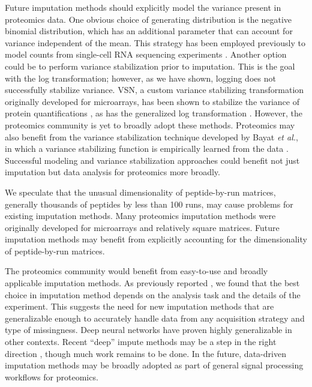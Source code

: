 \documentclass{article}
\begin{document}
Future imputation methods should explicitly model the variance present in proteomics data. One obvious choice of generating distribution is the negative binomial distribution, which has an additional parameter that can account for variance independent of the mean. This strategy has been employed previously to model counts from single-cell RNA sequencing experiments \cite{ZINB, neg-binom-scRNAseq}. Another option could be to perform variance stabilization prior to imputation. This is the goal with the log transformation; however, as we have shown, logging does not successfully stabilize variance. VSN, a custom variance stabilizing transformation originally developed for microarrays, has been shown to stabilize the variance of protein quantifications \cite{variance-stable-microarray, valikangas}, as has the generalized log transformation \cite{ms-noise-2-component}. However, the proteomics community is yet to broadly adopt these methods. Proteomics may also benefit from the variance stabilization technique developed by Bayat \textit{et al.}, in which a variance stabilizing function is empirically learned from the data \cite{variance-stable}. Successful modeling and variance stabilization approaches could benefit not just imputation but data analysis for proteomics more broadly.

We speculate that the unusual dimensionality of peptide-by-run matrices, generally thousands of peptides by less than 100 runs, may cause problems for existing imputation methods. Many proteomics imputation methods were originally developed for microarrays and relatively square matrices. Future imputation methods may benefit from explicitly accounting for the dimensionality of peptide-by-run matrices. 

The proteomics community would benefit from easy-to-use and broadly applicable imputation methods. As previously reported \cite{Bramer:review, Webb-Robertson:review, DIMA, lazar}, we found that the best choice in imputation method depends on the analysis task and the details of the experiment. This suggests the need for new imputation methods that are generalizable enough to accurately handle data from any acquisition strategy and type of missingness. Deep neural networks have proven highly generalizable in other contexts. Recent ``deep'' impute methods may be a step in the right direction \cite{deep-impute}, though much work remains to be done. In the future, data-driven imputation methods may be broadly adopted as part of general signal processing workflows for proteomics.
\end{document}
